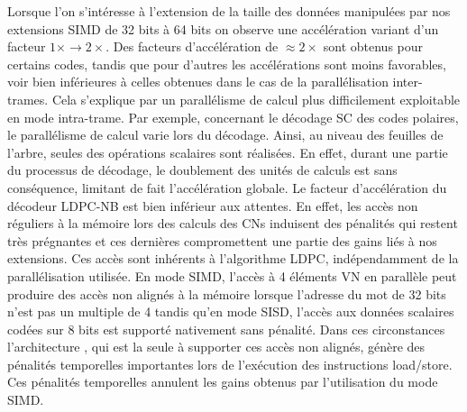 \documentclass[../main.tex]{subfiles}
\begin{document}
Lorsque l'on s'intéresse à l'extension de la taille des données manipulées par nos extensions SIMD de 32 bits à 64 bits on observe une accélération variant d'un facteur $1\times \rightarrow 2\times$. 
Des facteurs d'accélération de $\approx 2\times$ sont obtenus pour certains codes, tandis que pour d'autres les accélérations sont moins favorables, voir bien inférieures à celles obtenues dans le cas de la parallélisation inter-trames.
Cela s'explique par un parallélisme de calcul plus difficilement exploitable en mode intra-trame.
Par exemple, concernant le décodage SC des codes polaires, le parallélisme de calcul varie lors du décodage.
Ainsi, au niveau des feuilles de l'arbre, seules des opérations scalaires sont réalisées.
En effet, durant une partie du processus de décodage, le doublement des unités de calculs est sans conséquence, limitant de fait l'accélération globale.
Le facteur d'accélération du décodeur LDPC-NB est bien inférieur aux attentes.
En effet, les accès non réguliers à la mémoire lors des calculs des CNs induisent des pénalités qui restent très prégnantes et ces dernières compromettent une partie des gains liés à nos extensions. Ces accès sont inhérents à l'algorithme LDPC, indépendamment de la parallélisation utilisée. En mode SIMD, l'accès à 4 éléments VN en parallèle peut produire des accès non alignés à la mémoire lorsque l'adresse du mot de 32 bits n'est pas un multiple de 4 tandis qu'en mode SISD, l'accès aux données scalaires codées sur 8 bits est supporté nativement sans pénalité. Dans ces circonstances l'architecture \IBEX, qui est la seule à supporter ces accès non alignés, génère des pénalités temporelles importantes lors de l'exécution des instructions load/store. Ces pénalités temporelles annulent les gains obtenus par l'utilisation du mode SIMD.
\end{document}
